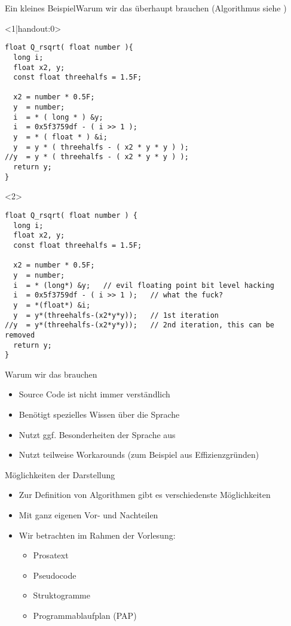 \begin{frame}[fragile]{Ein kleines Beispiel}{Warum wir das überhaupt brauchen (Algorithmus siehe \cite{wiki:qrsqrt})}
\lstset{style=cpp}
\begin{onlyenv}<1|handout:0>
\begin{lstlisting}
float Q_rsqrt( float number ){
  long i;
  float x2, y;
  const float threehalfs = 1.5F;

  x2 = number * 0.5F;
  y  = number;
  i  = * ( long * ) &y;                       
  i  = 0x5f3759df - ( i >> 1 );                
  y  = * ( float * ) &i;
  y  = y * ( threehalfs - ( x2 * y * y ) );   
//y  = y * ( threehalfs - ( x2 * y * y ) );   
  return y;
}
\end{lstlisting}
\end{onlyenv}
\begin{onlyenv}<2>
\begin{lstlisting}
float Q_rsqrt( float number ) {
  long i;
  float x2, y;
  const float threehalfs = 1.5F;

  x2 = number * 0.5F;
  y  = number;
  i  = * (long*) &y;   // evil floating point bit level hacking
  i  = 0x5f3759df - ( i >> 1 );   // what the fuck?
  y  = *(float*) &i;
  y  = y*(threehalfs-(x2*y*y));   // 1st iteration
//y  = y*(threehalfs-(x2*y*y));   // 2nd iteration, this can be removed
  return y;
}
\end{lstlisting}
\end{onlyenv}
\end{frame}

\begin{frame}{Warum wir das brauchen}
    \begin{itemize}[<+->]
        \item Source Code ist nicht immer verständlich
        \item Benötigt spezielles Wissen über die Sprache
        \item Nutzt ggf. Besonderheiten der Sprache aus
        \item Nutzt teilweise Workarounds (zum Beispiel aus Effizienzgründen)
    \end{itemize}
\end{frame}

\begin{frame}{Möglichkeiten der Darstellung}{}
    \begin{itemize}[<+->]
        \item Zur Definition von Algorithmen gibt es verschiedenste Möglichkeiten
        \item Mit ganz eigenen Vor- und Nachteilen
        \item Wir betrachten im Rahmen der Vorlesung:
        \begin{itemize}
            \item Prosatext
            \item Pseudocode
            \item Struktogramme
            \item Programmablaufplan (PAP)
        \end{itemize}
    \end{itemize}
\end{frame}

